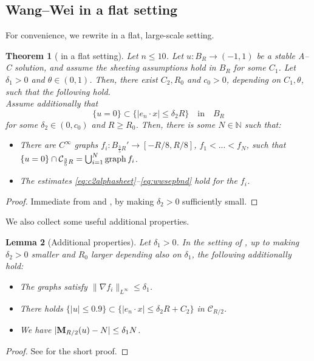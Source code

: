 \documentclass{article}
\newcommand{\N}{\mathbb{N}}
\newtheorem{theorem}{Theorem}[section]
\newtheorem{lemma}[theorem]{Lemma}
\theoremstyle{definition}
\begin{document}
\subsection{Wang--Wei in a flat setting}
For convenience, we rewrite  in a flat, large-scale setting.
\begin{theorem}[\cite{WW19} in a flat setting]\label{thm:sheetpart2}
     Let $n\leq 10$. Let $u:B_R\to (-1,1)$ be a stable A--C solution, and assume the sheeting assumptions hold in $B_R$ for some $C_1$. Let $\delta_1>0$ and $\theta\in(0,1)$. Then, there exist $C_2, R_0$ and $c_0>0$, depending on $C_1,\theta$, such that the following hold.\\
    Assume additionally that
    $$\{u=0\}\subset \{|e_n\cdot x|\leq \delta_2 R\}\quad\mbox{in}\quad B_R$$ 
    for some $\delta_2\in(0,c_0)$ and $R\geq R_0$. Then, there is some $N\in\N$ such that:
    \begin{itemize}
        \item There are $C^{\infty}$ graphs $f_i:B_{\frac{3}{5}R}'\to[-R/8,R/8]$, $f_1<...<f_N$, such that $\{u=0\}\cap \mathcal C_{\frac{3}{5}R}=\bigcup_{i=1}^N {\rm graph} \,f_i$.
    \item The estimates \eqref{eq:c2alphasheet}--\eqref{eq:wwsepbnd} hold for the $f_i$.
    \end{itemize}
\end{theorem}
\begin{proof}
    Immediate from  and , by making $\delta_2>0$ sufficiently small.
\end{proof}
We also collect some useful additional properties.
\begin{lemma}[Additional properties]\label{lem:addproperties}
    Let $\delta_1>0$. In the setting of , up to making $\delta_2>0$ smaller and $R_0$ larger depending also on $\delta_1$, the following additionally hold:
    \begin{itemize}
    \item The graphs satisfy $\|\nabla f_i\|_{L^\infty}\leq \delta_1$.
    \item There holds $\{|u|\leq 0.9\}\subset \{|e_n\cdot x|\leq \delta_2 R +C_2\}$ in $\mathcal C_{R/2}$.
    \item We have $|{\bf M}_{R/2}(u)-N|\leq \delta_1 N$.
    \end{itemize}
\end{lemma}
\begin{proof}
See \cite[Lemma 4.9]{FSstable} for the short proof.
\end{proof}
\end{document}
